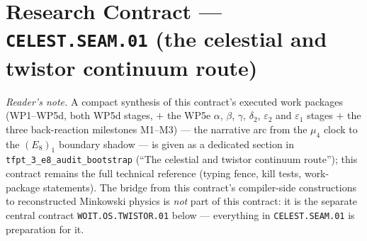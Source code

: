 \section*{Research Contract --- \texttt{CELEST.SEAM.01} (the celestial and twistor continuum route)}
\noindent\emph{Reader's note.} A compact synthesis of this contract's executed work packages
(WP1--WP5d, both WP5d stages, $+$ the WP5e $\alpha$, $\beta$, $\gamma$, $\delta_2$,
$\varepsilon_2$ and $\varepsilon_1$ stages $+$ the three back-reaction milestones M1--M3) --- the narrative arc from the $\mu_4$ clock to the $(E_8)_1$ boundary shadow --- is given as
a dedicated section in \texttt{tfpt\_3\_e8\_audit\_bootstrap} (``The celestial and twistor continuum
route''); this contract remains the full technical reference (typing
fence, kill tests, work-package statements). The bridge from this contract's compiler-side
constructions to reconstructed Minkowski physics is \emph{not} part of this contract: it is the
separate central contract \texttt{WOIT.OS.TWISTOR.01} below --- everything in \texttt{CELEST.SEAM.01}
is preparation for it.

